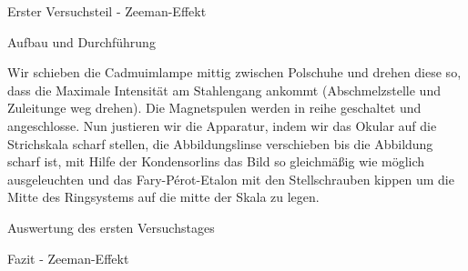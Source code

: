 \documentclass[pdftex, a4paper,11pt, twoside, ngerman]{report}
\begin{document}
  \begin{chapter}{Erster Versuchsteil - Zeeman-Effekt}
    \label{chp:Photoeffekt}
   
   
   
    \begin{section}{Aufbau und Durchführung}
      \label{chp:photoeffekt:sec:AufbauJustage}


      Wir schieben die Cadmuimlampe mittig zwischen Polschuhe und drehen diese so, dass die Maximale Intensität am Stahlengang ankommt (Abschmelzstelle und Zuleitunge weg drehen).
      Die Magnetspulen werden in reihe geschaltet und angeschlosse.
      Nun justieren wir die Apparatur, indem wir das Okular auf die Strichskala scharf stellen, die Abbildungslinse verschieben bis die Abbildung scharf ist, mit Hilfe der Kondensorlins das Bild so gleichmäßig wie möglich ausgeleuchten und das Fary-Pérot-Etalon mit den Stellschrauben kippen um die Mitte des Ringsystems auf die mitte der Skala zu legen.

      
      
    \end{section}
   
   
   
  
   
   
   
    \begin{section}{Auswertung des ersten Versuchstages}
      \label{chp:Photoeffekt:sec:Auswertung}
      
      
      
    \end{section}
   
   
   
    \begin{section}{Fazit - Zeeman-Effekt}
      \label{chp:Photoeffekt:sec:Fazit}
      
      
      
    \end{section}
   
  \end{chapter}
 
\end{document}
